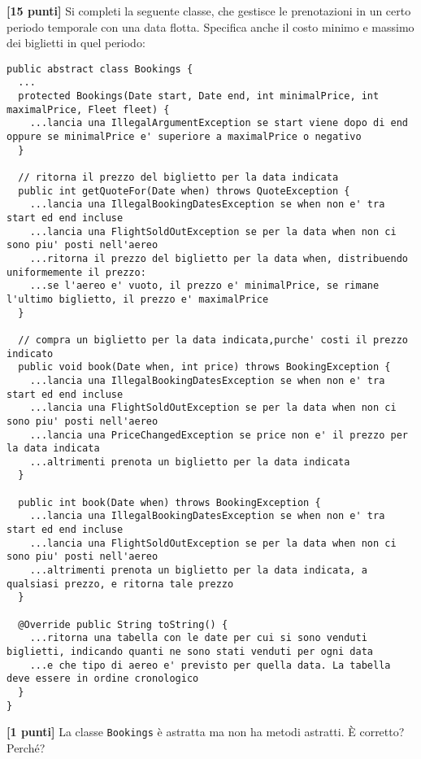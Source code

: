 \documentclass{article}[10pt]
\newcounter{esnu}
\newenvironment{esercizio}{\medskip \noindent {\bf Esercizio\addtocounter{esnu}{1} \arabic{esnu}}}{}
\begin{document}
\begin{esercizio}
\textbf{[15 punti]}
Si completi la seguente classe, che gestisce le prenotazioni in un certo periodo temporale con una data flotta.
Specifica anche il costo minimo e massimo dei biglietti in quel periodo:

{\scriptsize\begin{verbatim}
public abstract class Bookings {
  ...
  protected Bookings(Date start, Date end, int minimalPrice, int maximalPrice, Fleet fleet) {
    ...lancia una IllegalArgumentException se start viene dopo di end oppure se minimalPrice e' superiore a maximalPrice o negativo
  }

  // ritorna il prezzo del biglietto per la data indicata
  public int getQuoteFor(Date when) throws QuoteException {
    ...lancia una IllegalBookingDatesException se when non e' tra start ed end incluse
    ...lancia una FlightSoldOutException se per la data when non ci sono piu' posti nell'aereo
    ...ritorna il prezzo del biglietto per la data when, distribuendo uniformemente il prezzo:
    ...se l'aereo e' vuoto, il prezzo e' minimalPrice, se rimane l'ultimo biglietto, il prezzo e' maximalPrice
  }

  // compra un biglietto per la data indicata,purche' costi il prezzo indicato
  public void book(Date when, int price) throws BookingException {
    ...lancia una IllegalBookingDatesException se when non e' tra start ed end incluse
    ...lancia una FlightSoldOutException se per la data when non ci sono piu' posti nell'aereo
    ...lancia una PriceChangedException se price non e' il prezzo per la data indicata
    ...altrimenti prenota un biglietto per la data indicata
  }

  public int book(Date when) throws BookingException {
    ...lancia una IllegalBookingDatesException se when non e' tra start ed end incluse
    ...lancia una FlightSoldOutException se per la data when non ci sono piu' posti nell'aereo
    ...altrimenti prenota un biglietto per la data indicata, a qualsiasi prezzo, e ritorna tale prezzo
  }

  @Override public String toString() {
    ...ritorna una tabella con le date per cui si sono venduti biglietti, indicando quanti ne sono stati venduti per ogni data
    ...e che tipo di aereo e' previsto per quella data. La tabella deve essere in ordine cronologico
  }
}
\end{verbatim}}
%
\end{esercizio}

\begin{esercizio}
\textbf{[1 punti]}
La classe \texttt{Bookings} \`e astratta ma non ha metodi astratti. \`E corretto? Perch\'e?
\end{esercizio}
\end{document}
